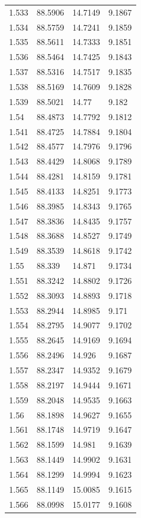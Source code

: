 \begin{tabular}{llll}
1.533 & 88.5906 & 14.7149 & 9.1867 \\
1.534 & 88.5759 & 14.7241 & 9.1859 \\
1.535 & 88.5611 & 14.7333 & 9.1851 \\
1.536 & 88.5464 & 14.7425 & 9.1843 \\
1.537 & 88.5316 & 14.7517 & 9.1835 \\
1.538 & 88.5169 & 14.7609 & 9.1828 \\
1.539 & 88.5021 & 14.77 & 9.182 \\
1.54 & 88.4873 & 14.7792 & 9.1812 \\
1.541 & 88.4725 & 14.7884 & 9.1804 \\
1.542 & 88.4577 & 14.7976 & 9.1796 \\
1.543 & 88.4429 & 14.8068 & 9.1789 \\
1.544 & 88.4281 & 14.8159 & 9.1781 \\
1.545 & 88.4133 & 14.8251 & 9.1773 \\
1.546 & 88.3985 & 14.8343 & 9.1765 \\
1.547 & 88.3836 & 14.8435 & 9.1757 \\
1.548 & 88.3688 & 14.8527 & 9.1749 \\
1.549 & 88.3539 & 14.8618 & 9.1742 \\
1.55 & 88.339 & 14.871 & 9.1734 \\
1.551 & 88.3242 & 14.8802 & 9.1726 \\
1.552 & 88.3093 & 14.8893 & 9.1718 \\
1.553 & 88.2944 & 14.8985 & 9.171 \\
1.554 & 88.2795 & 14.9077 & 9.1702 \\
1.555 & 88.2645 & 14.9169 & 9.1694 \\
1.556 & 88.2496 & 14.926 & 9.1687 \\
1.557 & 88.2347 & 14.9352 & 9.1679 \\
1.558 & 88.2197 & 14.9444 & 9.1671 \\
1.559 & 88.2048 & 14.9535 & 9.1663 \\
1.56 & 88.1898 & 14.9627 & 9.1655 \\
1.561 & 88.1748 & 14.9719 & 9.1647 \\
1.562 & 88.1599 & 14.981 & 9.1639 \\
1.563 & 88.1449 & 14.9902 & 9.1631 \\
1.564 & 88.1299 & 14.9994 & 9.1623 \\
1.565 & 88.1149 & 15.0085 & 9.1615 \\
1.566 & 88.0998 & 15.0177 & 9.1608 \\

\end{tabular}
